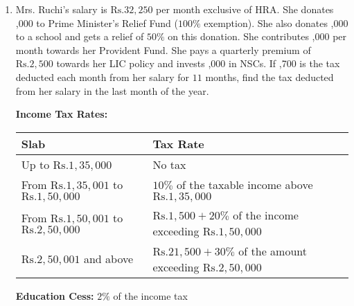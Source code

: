 \documentclass[12pt]{article}
\begin{document}
\begin{enumerate}
\item Mrs. Ruchi's salary is $\text{Rs.} 32,250$ per month exclusive of HRA. She donates ,000 to Prime Minister's Relief Fund ($100\%$ exemption). She also donates ,000 to a school and gets a relief of $50\%$ on this donation. She contributes ,000 per month towards her Provident Fund. She pays a quarterly premium of $\text{Rs.} 2,500$ towards her LIC policy and invests ,000 in NSCs. If ,700 is the tax deducted each month from her salary for $11$ months, find the tax deducted from her salary in the last month of the year.

\textbf{Income Tax Rates:}

\begin{tabular}{|l|l|}
\hline
Slab & Tax Rate \\
\hline
Up to $\text{Rs.} 1,35,000$ & No tax \\
\hline
From $\text{Rs.} 1,35,001$ to $\text{Rs.} 1,50,000$ & $10\%$ of the taxable income above $\text{Rs.} 1,35,000$ \\
\hline
From $\text{Rs.} 1,50,001$ to $\text{Rs.} 2,50,000$ & $\text{Rs.} 1,500 + 20\%$ of the income exceeding $\text{Rs.} 1,50,000$ \\
\hline
$\text{Rs.} 2,50,001$ and above & $\text{Rs.} 21,500 + 30\%$ of the amount exceeding $\text{Rs.} 2,50,000$ \\
\hline
\end{tabular}

\textbf{Education Cess:} $2\%$ of the income tax


\end{enumerate}
\end{document}
